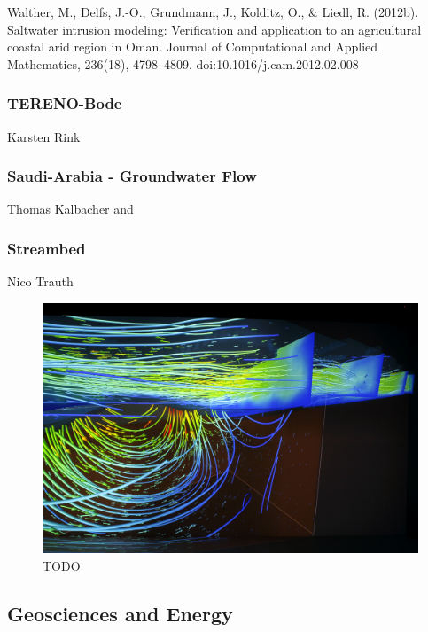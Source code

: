 Walther, M., Delfs, J.-O., Grundmann, J., Kolditz, O., \& Liedl, R.
(2012b). Saltwater intrusion modeling: Verification and application to
an agricultural coastal arid region in Oman. Journal of Computational
and Applied Mathematics, 236(18), 4798--4809.
doi:10.1016/j.cam.2012.02.008

\subsubsection{TERENO-Bode}\label{tereno-bode}

Karsten Rink

\subsubsection{Saudi-Arabia - Groundwater
Flow}\label{saudi-arabia---groundwater-flow}

Thomas Kalbacher \cite{zehner:modelcare} and \cite{rink:modelcare}

\subsubsection{Streambed}\label{streambed}

Nico Trauth

\begin{figure}
  \includegraphics[width=\linewidth]{images/streambed.jpg}
\caption{TODO}
\label{fig:streambed}
\end{figure}

\subsection{Geosciences and Energy}\label{geosciences-and-energy}

